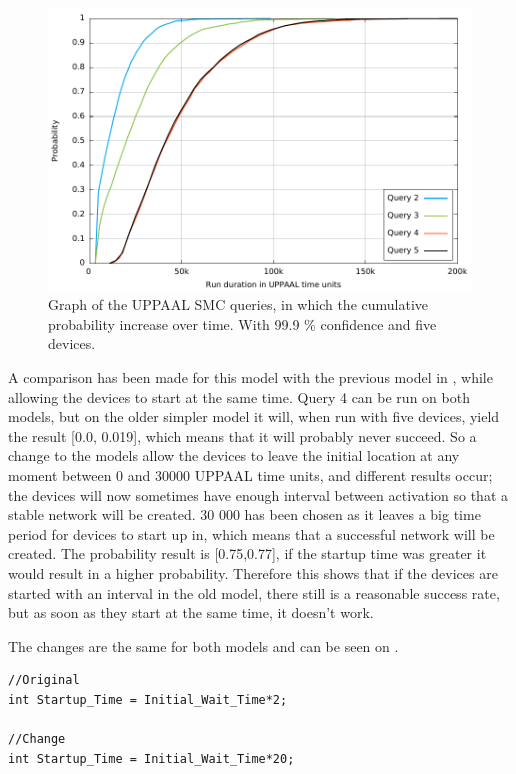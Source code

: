 \begin{figure}[ht]
  \includegraphics[width=1\textwidth]{Figures/Graphs/gnuplot/uppaal/graph.pdf} 
\caption{Graph of the UPPAAL SMC queries, in which the cumulative probability increase over time. With 99.9 \% confidence and five devices.}
\label{fig:ConnectQueryTime}
\end{figure}

\bigskip
A comparison has been made for this model with the previous model in , while allowing the devices to start at the same time.
Query 4 can be run on both models, but on the older simpler model it will, when run with five devices, yield the result [0.0, 0.019], which means that it will probably never succeed.
So a change to the models allow the devices to leave the initial location at any moment between 0 and 30000 UPPAAL time units, and different results occur; the devices will now sometimes have enough interval between activation so that a stable network will be created. 
30 000 has been chosen as it leaves a big time period for devices to start up in, which means that a successful network will be created.
The probability result is [0.75,0.77], if the startup time was greater it would result in a higher probability.
Therefore this shows that if the devices are started with an interval in the old model, there still is a reasonable success rate, but as soon as they start at the same time, it doesn't work. 

The changes are the same for both models and can be seen on . 

\begin{lstlisting}[style=UPPAAL, caption={Change in the start up time for devices.}, label={lst:startuptimeChanceListing}]
//Original
int Startup_Time = Initial_Wait_Time*2;

//Change
int Startup_Time = Initial_Wait_Time*20;
\end{lstlisting}

